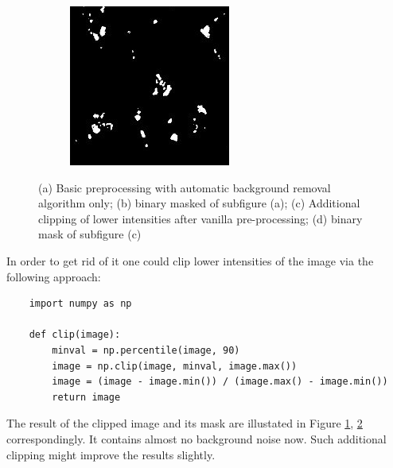 \begin{figure}[htb]
\begin{subfigure}[b]{0.22\textwidth}
		\caption{}
		\label{subfig:clipping}
	\end{subfigure}
	\hfill
	\begin{subfigure}[b]{0.22\textwidth}
		\centering
		\includegraphics[width=\textwidth]{bilder/preprocessing/crop_golgi_full_processed_mask.png}
		\caption{}
		\label{subfig:clipping-mask}
	\end{subfigure}
	   \caption{(a) Basic preprocessing with automatic background removal algorithm only; (b) binary masked of subfigure (a); (c) Additional clipping of lower intensities after vanilla pre-processing; (d) binary mask of subfigure (c)}
	   \label{fig:pre-processing-golgi}
\end{figure}
In order to get rid of it one could clip lower intensities of the image via the following approach:
\begin{lstlisting}
	import numpy as np
		
	def clip(image):
		minval = np.percentile(image, 90)
		image = np.clip(image, minval, image.max())
		image = (image - image.min()) / (image.max() - image.min())
		return image
\end{lstlisting}

The result of the clipped image and its mask are illustated in Figure \ref{subfig:clipping}, \ref{subfig:clipping-mask} correspondingly. It contains almost no background noise now. Such additional clipping might improve the results slightly.